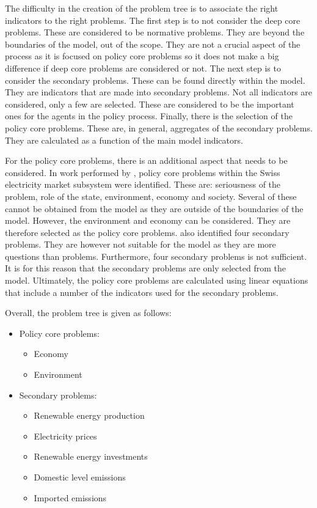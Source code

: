 \documentclass[12pt]{article}
\begin{document}
The difficulty in the creation of the problem tree is to associate the right indicators to the right problems. The first step is to not consider the deep core problems. These are considered to be normative problems. They are beyond the boundaries of the model, out of the scope. They are not a crucial aspect of the process as it is focused on policy core problems so it does not make a big difference if deep core problems are considered or not. The next step is to consider the secondary problems. These can be found directly within the model. They are indicators that are made into secondary problems. Not all indicators are considered, only a few are selected. These are considered to be the important ones for the agents in the policy process. Finally, there is the selection of the policy core problems. These are, in general, aggregates of the secondary problems. They are calculated as a function of the main model indicators.

For the policy core problems, there is an additional aspect that needs to be considered. In work performed by \citeauthor{markard2016socio}, policy core problems within the Swiss electricity market subsystem were identified. These are: seriousness of the problem, role of the state, environment, economy and society. Several of these cannot be obtained from the model as they are outside of the boundaries of the model. However, the environment and economy can be considered. They are therefore selected as the policy core problems. \cite{markard2016socio} also identified four secondary problems. They are however not suitable for the model as they are more questions than problems. Furthermore, four secondary problems is not sufficient. It is for this reason that the secondary problems are only selected from the model. Ultimately, the policy core problems are calculated using linear equations that include a number of the indicators used for the secondary problems.

Overall, the problem tree is given as follows:

\begin{itemize}
\item Policy core problems:
	\begin{itemize}
	\item Economy
	\item Environment
	\end{itemize}
\item Secondary problems:
	\begin{itemize}
	\item Renewable energy production
	\item Electricity prices
	\item Renewable energy investments
	\item Domestic level emissions
	\item Imported emissions
	\end{itemize}
\end{itemize}
\end{document}
